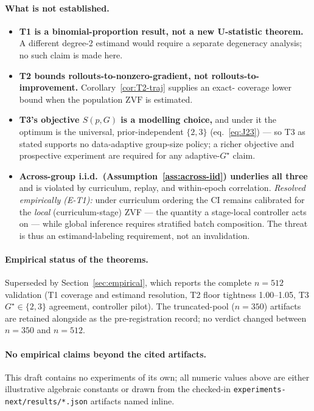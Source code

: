 \documentclass[11pt]{article}
\theoremstyle{plain}
\theoremstyle{definition}
\theoremstyle{remark}
\newcommand{\ZVF}{\ensuremath{\mathrm{ZVF}}}
\newcommand{\1}{\mathbb{1}}
\begin{document}
\paragraph{What is not established.}
\begin{itemize}[leftmargin=1.5em,itemsep=1pt]
  \item \textbf{T1 is a binomial-proportion result, not a new U-statistic
        theorem.} A different degree-2 estimand would require a separate
        degeneracy analysis; no such claim is made here.
  \item \textbf{T2 bounds rollouts-to-nonzero-gradient, not
        rollouts-to-improvement.} Corollary~\ref{cor:T2-traj} supplies an exact-
        coverage lower bound when the population $\ZVF$ is estimated.
  \item \textbf{T3's objective $S(p,G)$ is a modelling choice,} and under it
        the optimum is the universal, prior-independent $\{2,3\}$
        (eq.~\ref{eq:J23}) --- so T3 as stated supports no data-adaptive
        group-size policy; a richer objective and prospective experiment are
        required for any adaptive-$G^\star$ claim.
  \item \textbf{Across-group i.i.d.\ (Assumption~\ref{ass:across-iid})
        underlies all three} and is violated by curriculum, replay, and
        within-epoch correlation. \emph{Resolved empirically (E-T1):} under
        curriculum ordering the CI remains calibrated for the \emph{local}
        (curriculum-stage) ZVF --- the quantity a stage-local controller
        acts on --- while global inference requires stratified batch
        composition. The threat is thus an estimand-labeling requirement,
        not an invalidation.
\end{itemize}

\paragraph{Empirical status of the theorems.} Superseded by
Section~\ref{sec:empirical}, which reports the complete $n{=}512$
validation (T1 coverage and estimand resolution, T2 floor tightness
1.00--1.05, T3 $G^\star\in\{2,3\}$ agreement, controller pilot). The
truncated-pool ($n{=}350$) artifacts are retained alongside as the
pre-registration record; no verdict changed between $n{=}350$ and
$n{=}512$.

\paragraph{No empirical claims beyond the cited artifacts.} This draft
contains no experiments of its own; all numeric values above are either
illustrative algebraic constants or drawn from the checked-in
\texttt{experiments-next/results/*.json} artifacts named inline.



\end{document}
